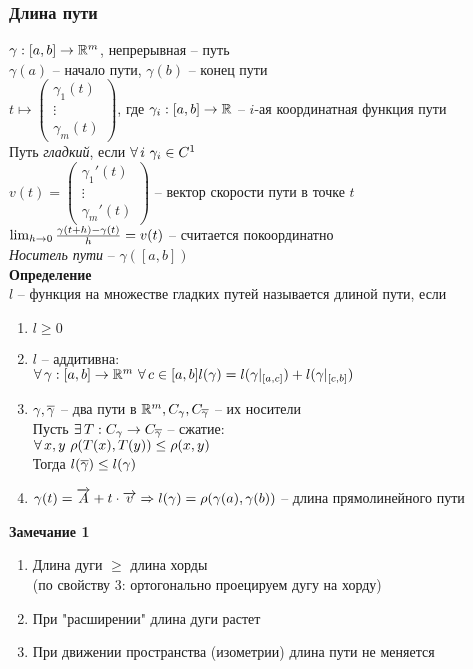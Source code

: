 \documentclass[12pt]{article}
\begin{document}
\subsubsection{Длина пути}
$\gamma: [a,b] \rightarrow \mathbb{R}^m$, непрерывная -- путь\\
$\gamma(a)$ -- начало пути, $\gamma(b)$ -- конец пути\\
$t \mapsto \begin{pmatrix}
\gamma_1(t)\\
\vdots\\
\gamma_m(t)
\end{pmatrix}$, где $\gamma_i: [a,b] \rightarrow \mathbb{R}$ -- $i$-ая координатная функция пути\\
Путь \textit{гладкий}, если $\forall\, i\ \gamma_i \in C^1$\\
$v(t) = \begin{pmatrix}
    \gamma_1'(t)\\
    \vdots\\
    \gamma_m'(t)
\end{pmatrix}$ -- вектор скорости пути в точке $t$\\
$\lim_{h\rightarrow 0}\frac{\gamma(t+h)-\gamma(t)}{h} = v(t)$ -- считается покоординатно\\
\textit{Носитель пути} -- $\gamma([a,b])$\\
\textbf{Определение}\\
$l$ -- функция на множестве гладких путей называется длиной пути, если
\begin{enumerate}
    \item $l \geq 0$
    \item $l$ -- аддитивна:\\
    $\forall\, \gamma: [a,b] \rightarrow \mathbb{R}^m\ \forall\, c \in [a,b] l(\gamma) = l(\gamma|_{[a,c]})+l(\gamma|_{[c,b]})$
    \item $\gamma, \overline\gamma$ -- два пути в $\mathbb{R}^m, C_\gamma, C_{\overline\gamma}$ -- их носители\\
    Пусть $\exists\, T: C_\gamma \rightarrow C_{\overline \gamma}$ -- сжатие:\\
    $\forall\, x,y\ \rho(T(x), T(y)) \leq \rho(x,y)$\\
    Тогда $l(\overline \gamma) \leq l(\gamma)$
    \item $\gamma(t) = \overrightarrow A+t\cdot\overrightarrow v \Rightarrow l(\gamma) = \rho(\gamma(a), \gamma(b))$ -- длина прямолинейного пути
\end{enumerate}
\textbf{Замечание 1}
\begin{enumerate}
    \item Длина дуги $\geq$ длина хорды\\
    (по свойству 3: ортогонально проецируем дугу на хорду)
    \item При "расширении" длина дуги растет
    \item При движении пространства (изометрии) длина пути не меняется
\end{enumerate}
\end{document}
